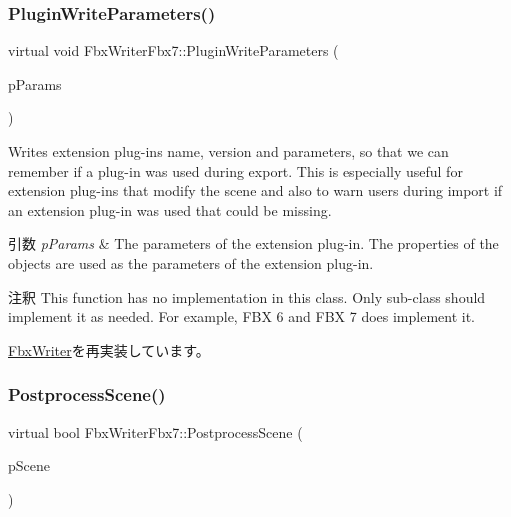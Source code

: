 \mbox{\label{class_fbx_writer_fbx7_a36f757ea224bdb66cf732cb9a5a534f2}} 
\subsubsection{\texorpdfstring{Plugin\+Write\+Parameters()}{PluginWriteParameters()}}
{\footnotesize\ttfamily virtual void Fbx\+Writer\+Fbx7\+::\+Plugin\+Write\+Parameters (\begin{DoxyParamCaption}\item[{\hyperlink{class_fbx_object}{Fbx\+Object} \&}]{p\+Params }\end{DoxyParamCaption})\hspace{0.3cm}{\ttfamily [virtual]}}

Writes extension plug-\/ins name, version and parameters, so that we can remember if a plug-\/in was used during export. This is especially useful for extension plug-\/ins that modify the scene and also to warn users during import if an extension plug-\/in was used that could be missing. 
\begin{DoxyParams}{引数}
{\em p\+Params} & The parameters of the extension plug-\/in. The properties of the objects are used as the parameters of the extension plug-\/in. \\
\hline
\end{DoxyParams}
\begin{DoxyRemark}{注釈}
This function has no implementation in this class. Only sub-\/class should implement it as needed. For example, F\+BX 6 and F\+BX 7 does implement it. 
\end{DoxyRemark}


\hyperlink{class_fbx_writer_a851219ad904ebdce34acd3b8699cb0c8}{Fbx\+Writer}を再実装しています。

\mbox{\label{class_fbx_writer_fbx7_aa51d7f58358361aaa30835a32fdb17cf}} 
\subsubsection{\texorpdfstring{Postprocess\+Scene()}{PostprocessScene()}}
{\footnotesize\ttfamily virtual bool Fbx\+Writer\+Fbx7\+::\+Postprocess\+Scene (\begin{DoxyParamCaption}\item[{\hyperlink{class_fbx_scene}{Fbx\+Scene} \&}]{p\+Scene }\end{DoxyParamCaption})\hspace{0.3cm}{\ttfamily [virtual]}}

